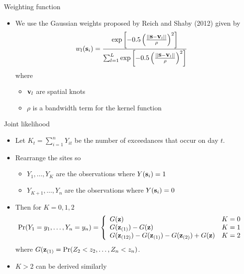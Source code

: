 \documentclass{beamer}
\begin{document}
\begin{frame}{Weighting function}
  \begin{itemize} \setlength{\itemsep}{0.5em}
    \item We use the Gaussian weights proposed by Reich and Shaby (2012) given by
    \footnotesize{
    \begin{align*}
      w_l(\mbox{\bf s}_i) = \frac{ \exp\left[ -0.5 \left( \frac{ || \mbox{\bf s} - \mbox{\bf v}_l || }{ \rho} \right)^2 \right]}{ \sum_{l = 1}^L \exp\left[ -0.5 \left( \frac{ || \mbox{\bf s} - \mbox{\bf v}_l || }{ \rho} \right)^2 \right] }
    \end{align*}
    }
    where
    \begin{itemize}
      \item $\mbox{\bf v}_l$ are spatial knots
      \item $\rho$ is a bandwidth term for the kernel function
    \end{itemize}
  \end{itemize}
\end{frame}

\begin{frame}{Joint likelihood}
  \begin{itemize} \setlength{\itemsep}{0.5em}
    \item Let $K_t = \sum_{i = 1}^n Y_{it}$ be the number of exceedances that occur on day $t$.
    \item Rearrange the sites so
    \begin{itemize}
      \item $Y_1, \ldots, Y_K$ are the observations where $Y(\mbox{\bf s}_i) = 1$
      \item $Y_{K+1}, \ldots, Y_n$ are the observations where $Y(\mbox{\bf s}_i) = 0$
    \end{itemize}
    \item Then for $K = 0, 1, 2$
    {\scriptsize
    \begin{align*}
      \Pr(Y_1 = y_1, \ldots, Y_n = y_n) = \left\{ \begin{array}{ll}
        G(\mbox{\bf z})  & K = 0\\
        G(\mbox{\bf z}_{(1)}) - G(\mbox{\bf z}) & K = 1\\
        G(\mbox{\bf z}_{(12)}) - G(\mbox{\bf z}_{(1)}) - G(\mbox{\bf z}_{(2)}) + G(\mbox{\bf z}) & K =2
      \end{array}\right.
    \end{align*}
    }
    where $G(\mbox{\bf z}_{(1)} = \Pr(Z_2 < z_2, \ldots, Z_n < z_n)$.
    \item $K > 2$ can be derived similarly
  \end{itemize}
\end{frame}
\end{document}
